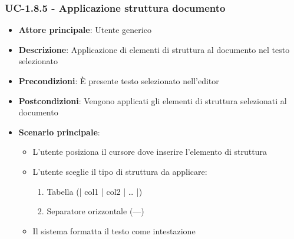\documentclass[11pt,a4paper]{article}
\begin{document}
\subsubsection{UC-1.8.5 - Applicazione struttura documento}
\begin{itemize}
    \item \textbf{Attore principale}: Utente generico
    \item \textbf{Descrizione}: Applicazione di elementi di struttura al documento nel testo selezionato
    \item \textbf{Precondizioni}: È presente testo selezionato nell’editor
    \item \textbf{Postcondizioni}: Vengono applicati gli elementi di struttura selezionati al documento
    \item \textbf{Scenario principale}:
        \begin{itemize}
            \item L’utente posiziona il cursore dove inserire l’elemento di struttura
            \item L’utente sceglie il tipo di struttura da applicare:
                \begin{enumerate}
                    \item Tabella (| col1 | col2 | … |)
                    \item Separatore orizzontale (---)
                \end{enumerate}
            \item Il sistema formatta il testo come intestazione
        \end{itemize}
\end{itemize}
\end{document}
